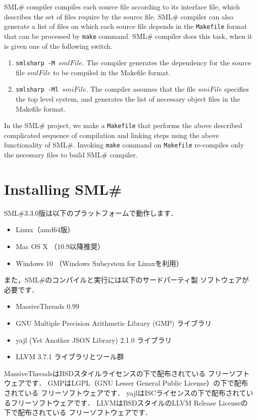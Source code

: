 \documentclass{jbook}
\newcommand{\txt}[2]{#2}
\newcommand{\smlsharp}{SML\#}
\newcommand{\version}{3.3.0}
\begin{document}
	\smlsharp{} compiler compiles each source file according to its
interface file, which describes the set of files require by the source
file.
	\smlsharp{} compiler can also generate a list of files on which
each source file depends in the {\tt Makefile} format that can be
processed by {\tt make} command. 
	\smlsharp{} compiler does this task, when it is given one of the
following switch.

\begin{enumerate}
\item {\tt smlsharp -M $\mathit{smlFile}$}.
	The compiler generates the dependency for the source file
$\mathit{smlFile}$ to be compiled in the Makefile format. 
\item {\tt smlsharp -Ml $\mathit{smiFile}$}.
	The compiler assumes that the file $\mathit{smiFile}$ specifies the
top level system, and generates the list of necessary object files in the
Makefile format. 
\end{enumerate}	

	In the \smlsharp{} project, we make a {\tt Makefile} that
performs the above described complicated sequence of compilation and
linking steps using the above functionality of \smlsharp{}.
	Invoking {\tt make} command on {\tt Makefile} re-compiles only
the necessary files to build \smlsharp{} compiler.
\fi%

\section{
\txt{\smlsharp{}のインストール}
    {Installing \smlsharp{}}}
\label{sec:tutorialInstall}

\ifjp%
	\smlsharp{}\version{}版は以下のプラットフォームで動作します．
\begin{itemize}
\item Linux（amd64版）
\item Mac OS X （10.9以降推奨）
\item Windows 10 （Windows Subsystem for Linuxを利用）
\end{itemize}

	また，\smlsharp{}のコンパイルと実行には以下のサードパーティ製
ソフトウェアが必要です．
\begin{itemize}
\item MassiveThreads 0.99
\item GNU Multiple Precision Arithmetic Library (GMP) ライブラリ
\item yajl (Yet Another JSON Library) 2.1.0 ライブラリ
\item LLVM 3.7.1 ライブラリとツール群
\end{itemize}
	MassiveThreadsはBSDスタイルライセンスの下で配布されている
フリーソフトウェアです．
	GMPはLGPL（GNU Lesser General Public License）の下で配布されている
フリーソフトウェアです．
	yajlはISCライセンスの下で配布されているフリーソフトウェアです．
	LLVMはBSDスタイルのLLVM Release Licenseの下で配布されている
フリーソフトウェアです．
\end{document}
